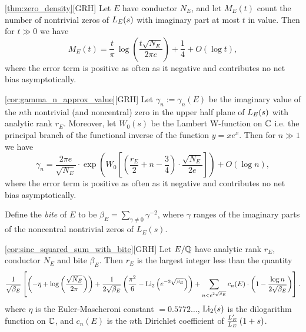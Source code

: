 \begin{quotedtheorem}{\ref{thm:zero_density}}[GRH]
Let $E$ have conductor $N_E$, and let $M_E(t)$ count the number of nontrivial zeros of $L_E(s)$ with imaginary part at most $t$ in value. Then for $t \gg 0$ we have
\begin{equation}\label{eqn:zero_density}
M_E(t) = \frac{t}{\pi} \, \log\left(\frac{t\sqrt{N_E}}{2\pi e}\right) + \frac{1}{4} + O(\log t),
\end{equation}
where the error term is positive as often as it negative and contributes no net bias asymptotically.
\end{quotedtheorem}

\begin{quotedcorollary}{\ref{cor:gamma_n_approx_value}}[GRH]
Let $\gamma_n := \gamma_n(E)$ be the imaginary value of the $n$th nontrivial (and noncentral) zero in the upper half plane of $L_E(s)$ with analytic rank $r_E$.  Moreover, let $W_0 (s)$ be the Lambert W-function on $\mathbb{C}$ i.e. the principal branch of the functional inverse of the function $y = x e^x$. Then for $n \gg 1$ we have
\begin{equation}
\gamma_n = \frac{2\pi e}{\sqrt{N_E}} \cdot \exp \left(W_0\left[\left(\frac{r_E}{2} +n - \frac{3}{4}\right)\cdot \frac{\sqrt{N_E}}{2 e}\right]\right) + O(\log n),
\end{equation}
where the error term is positive as often as it negative and contributes no net bias asymptotically.
\end{quotedcorollary}

Define the {\it bite} of $E$ to be $\beta_E = \sum_{\gamma \ne 0} \gamma^{-2}$, where $\gamma$ ranges of the imaginary parts of the noncentral nontrivial zeros of $L_E(s)$.
\begin{quotedcorollary}{\ref{cor:sinc_squared_sum_with_bite}}[GRH]
Let $E/\mathbb{Q}$ have analytic rank $r_E$, conductor $N_E$ and bite $\beta_E$. Then $r_E$ is the largest integer less than the quantity
\begin{equation}
\frac{1}{\sqrt{\beta_E}}\left[\left(-\eta + \log\left(\frac{\sqrt{N_E}}{2\pi}\right)\right)+ \frac{1}{2 \sqrt{\beta_E}}\left(\frac{\pi^2}{6} - \operatorname{Li}_2\left(e^{-2\sqrt{\beta_E}}\right)\right) + \sum_{n<e^{2\sqrt{\beta_E}}} c_n(E) \cdot \left(1-\frac{\log n}{2\sqrt{\beta_E}}\right)\right].
\end{equation}
where $\eta$ is the Euler-Mascheroni constant $= 0.5772\ldots$, $\operatorname{Li}_2(s)$ is the dilogarithm function on $\mathbb{C}$, and $c_n(E)$ is the $n$th Dirichlet coefficient of $\frac{L_E^{\prime}}{L_E}\left(1+s\right)$.
\end{quotedcorollary}

